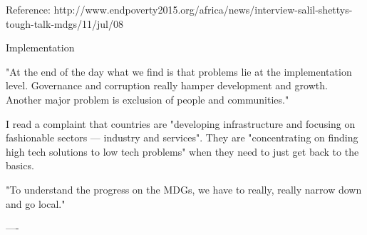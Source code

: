 Reference: http://www.endpoverty2015.org/africa/news/interview-salil-shettys-tough-talk-mdgs/11/jul/08

Implementation

"At the end of the day what we find is that problems lie at the implementation level. Governance and corruption really hamper development and growth. Another major problem is exclusion of people and communities."

I read a complaint that countries are "developing infrastructure and focusing on fashionable sectors — industry and services". They are "concentrating on finding high tech solutions to low tech problems" when they need to just get back to the basics.

"To understand the progress on the MDGs, we have to really, really narrow down and go local."

----